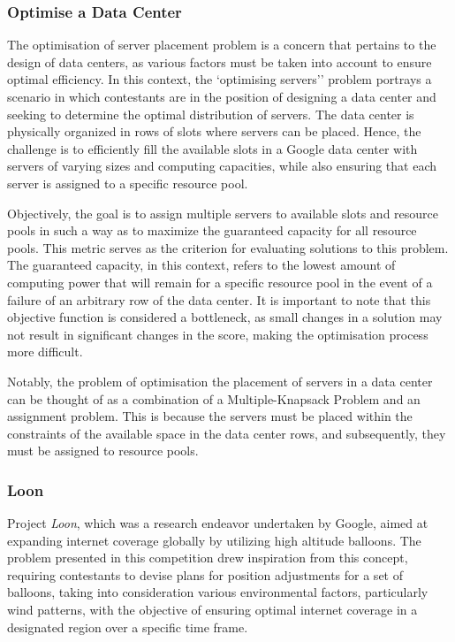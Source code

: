 \subsubsection*{Optimise a Data Center}
\label{subsubsec:hashcode-2015-qualification}

The optimisation of server placement problem is a concern that pertains to the
design of data centers, as various factors must be taken into account to ensure
optimal efficiency. In this context, the `optimising servers'' problem portrays
a scenario in which contestants are in the position of designing a data center
and seeking to determine the optimal distribution of servers. The data center
is physically organized in rows of slots where servers can be placed. Hence,
the challenge is to efficiently fill the available slots in a Google data center
with servers of varying sizes and computing capacities, while also ensuring that
each server is assigned to a specific resource pool.

Objectively, the goal is to assign multiple servers to available slots and
resource pools in such a way as to maximize the guaranteed capacity for all
resource pools. This metric serves as the criterion for evaluating solutions to
this problem. The guaranteed capacity, in this context, refers to the lowest
amount of computing power that will remain for a specific resource pool in the
event of a failure of an arbitrary row of the data center. It is important to
note that this objective function is considered a bottleneck, as small changes
in a solution may not result in significant changes in the score, making the
optimisation process more difficult.

Notably, the problem of optimisation the placement of servers in a data center can
be thought of as a combination of a Multiple-Knapsack Problem and an assignment
problem. This is because the servers must be placed within the constraints of
the available space in the data center rows, and subsequently, they must be
assigned to resource pools.

\subsubsection*{Loon}
\label{subsubsec:hashcode-2015-final}

Project \textit{Loon}, which was a research endeavor undertaken by Google, aimed at
expanding internet coverage globally by utilizing high altitude balloons. The
problem presented in this competition drew inspiration from this concept,
requiring contestants to devise plans for position adjustments for a set of
balloons, taking into consideration various environmental factors, particularly
wind patterns, with the objective of ensuring optimal internet coverage in a
designated region over a specific time frame.

